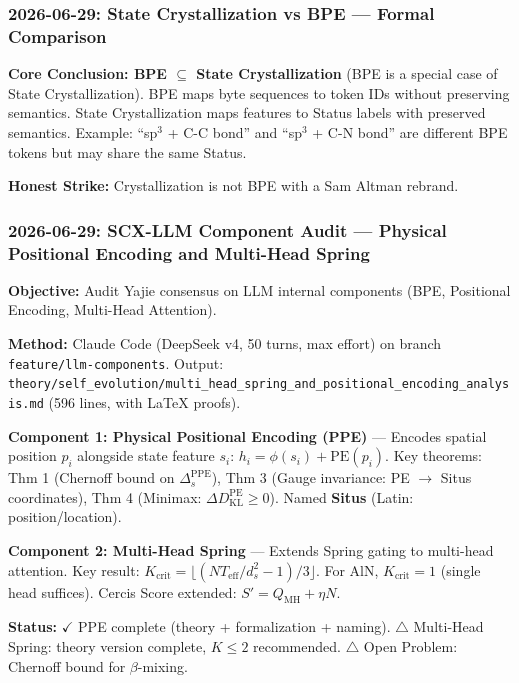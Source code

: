 \documentclass[12pt]{article}
\begin{document}
\subsubsection{2026-06-29: State Crystallization vs BPE --- Formal Comparison}
\textbf{Core Conclusion: BPE \(\subseteq\) State Crystallization} (BPE is a special case of State Crystallization). BPE maps byte sequences to token IDs without preserving semantics. State Crystallization maps features to Status labels with preserved semantics. Example: ``sp\(^3\) + C-C bond'' and ``sp\(^3\) + C-N bond'' are different BPE tokens but may share the same Status.\par
\textbf{Honest Strike:} Crystallization is not BPE with a Sam Altman rebrand.

\subsubsection{2026-06-29: SCX-LLM Component Audit --- Physical Positional Encoding and Multi-Head Spring}
\textbf{Objective:} Audit Yajie consensus on LLM internal components (BPE, Positional Encoding, Multi-Head Attention).\par
\textbf{Method:} Claude Code (DeepSeek v4, 50 turns, max effort) on branch \texttt{feature/llm-components}. Output: \texttt{theory/self\_evolution/multi\_head\_spring\_and\_positional\_encoding\_analysis.md} (596 lines, with LaTeX proofs).\par

\textbf{Component 1: Physical Positional Encoding (PPE)} --- Encodes spatial position \(p_i\) alongside state feature \(s_i\): \(h_i = \phi(s_i) + \text{PE}(p_i)\). Key theorems: Thm 1 (Chernoff bound on \(\Delta_s^{\text{PPE}}\)), Thm 3 (Gauge invariance: PE \(\to\) Situs coordinates), Thm 4 (Minimax: \(\Delta D_{\text{KL}}^{\text{PE}} \geq 0\)). Named \textbf{Situs} (Latin: position/location).\par

\textbf{Component 2: Multi-Head Spring} --- Extends Spring gating to multi-head attention. Key result: \(K_{\text{crit}} = \lfloor(NT_{\text{eff}}/d_s^2 - 1)/3\rfloor\). For AlN, \(K_{\text{crit}}=1\) (single head suffices). Cercis Score extended: \(S' = Q_{\text{MH}} + \eta N\).\par

\textbf{Status:} \(\checkmark\) PPE complete (theory + formalization + naming). \(\triangle\) Multi-Head Spring: theory version complete, \(K \leq 2\) recommended. \(\triangle\) Open Problem: Chernoff bound for \(\beta\)-mixing.
\end{document}
